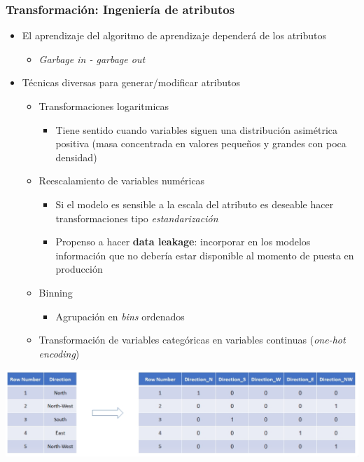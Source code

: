 \documentclass[leqno, 10pt, envcountsect]{beamer}
\numberwithin{equation}{section}
\theoremstyle{definition}
\theoremstyle{example}
\numberwithin{figure}{section}
\numberwithin{table}{section}
\let\olditem\item
\renewcommand{\item}{%
\olditem\vspace{1pt}}
\begin{document}
\begin{frame}
  \frametitle{Transformación: Ingeniería de atributos}
  \begin{itemize}
    \item El aprendizaje del algoritmo de aprendizaje dependerá de los
      atributos
      \begin{itemize}
        \item \textit{Garbage in - garbage out}
      \end{itemize}
      \item Técnicas diversas para generar/modificar atributos
        \begin{itemize}
          \item Transformaciones logaritmicas
            \begin{itemize}
              \item Tiene sentido cuando variables siguen una distribución
                asimétrica positiva (masa concentrada en valores pequeños y
                grandes con poca densidad)
            \end{itemize}
          \item Reescalamiento de variables numéricas
            \begin{itemize}
              \item Si el modelo es sensible a la escala del atributo es
                deseable hacer transformaciones tipo \textit{estandarización}
              \item Propenso a hacer \textbf{data leakage}: incorporar en los
                modelos información que no debería estar disponible al momento
                de puesta en producción
            \end{itemize}
          \item Binning
            \begin{itemize}
              \item Agrupación en \textit{bins} ordenados
            \end{itemize}
          \item Transformación de variables categóricas en variables continuas
            (\textit{one-hot encoding})
      \end{itemize}
  \end{itemize}
  \begin{center}
    \includegraphics[scale=0.17]{one_hot.png}
  \end{center}
\end{frame}
\end{document}

